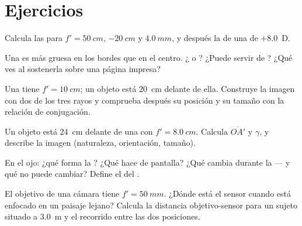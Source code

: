\section{Ejercicios}

\begin{exercise}[$\star$]\label{exo:g11:lenses-and-eye:1}
Calcula las  para $f' = \qty{50}{cm}$,
$\qty{-20}{cm}$ y $\qty{4.0}{mm}$, y después la  de una
 de $+8.0$~D.
\end{exercise}

\begin{exercise}[$\star$]\label{exo:g11:lenses-and-eye:2}
Una  es más gruesa en los bordes que en el centro. ¿ o
? ¿Puede servir de ? ¿Qué ves al sostenerla sobre una
página impresa?
\end{exercise}

\begin{exercise}[$\star$]\label{exo:g11:lenses-and-eye:3}
Una  tiene $f' = \qty{10}{cm}$; un objeto está
\qty{20}{cm} delante de ella. Construye la imagen con dos de los tres
rayos y comprueba después su posición y su tamaño con la relación de
conjugación.
\end{exercise}

\begin{exercise}[$\star$]\label{exo:g11:lenses-and-eye:4}
Un objeto está \qty{24}{cm} delante de una  con
$f' = \qty{8.0}{cm}$. Calcula $\overline{OA'}$ y $\gamma$, y describe la
imagen (naturaleza, orientación, tamaño).
\end{exercise}

\begin{exercise}[$\star$]\label{exo:g11:lenses-and-eye:5}
En el ojo: ¿qué forma la ? ¿Qué hace de pantalla? ¿Qué
cambia durante la  --- y qué no puede cambiar? Define el
 del .
\end{exercise}

\begin{exercise}[$\star\star$]\label{exo:g11:lenses-and-eye:6}
El objetivo de una cámara tiene $f' = \qty{50}{mm}$. ¿Dónde está el
sensor cuando está enfocado en un paisaje lejano? Calcula la distancia
objetivo-sensor para un sujeto situado a \qty{3.0}{m} y el recorrido
entre las dos posiciones.
\end{exercise}

